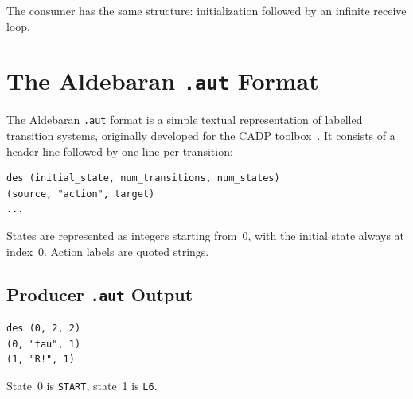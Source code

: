 \documentclass[11pt]{article}
\begin{document}
\begin{center}
\end{center}

The consumer has the same structure: initialization followed by an
infinite receive loop.

\section{The Aldebaran \texttt{.aut} Format}

The Aldebaran \texttt{.aut} format is a simple textual representation
of labelled transition systems, originally developed for the CADP
toolbox~\cite{cadp}.  It consists of a header line followed by one
line per transition:

\begin{Verbatim}[samepage=true,xleftmargin=2em]
des (initial_state, num_transitions, num_states)
(source, "action", target)
...
\end{Verbatim}

States are represented as integers starting from~0, with the initial
state always at index~0.  Action labels are quoted strings.

\subsection{Producer \texttt{.aut} Output}

\begin{Verbatim}[samepage=true,xleftmargin=2em]
des (0, 2, 2)
(0, "tau", 1)
(1, "R!", 1)
\end{Verbatim}

State~0 is \texttt{START}, state~1 is \texttt{L6}.

\end{document}
